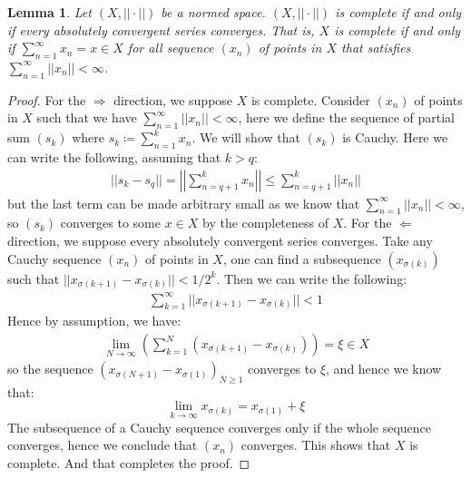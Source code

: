 \documentclass[11pt]{book}
\theoremstyle{break}
\theoremstyle{break}
\newtheorem{lem}{Lemma}[thm]
\begin{document}
\begin{lem}
Let $(X,||\cdot ||)$ be a normed space. $(X,||\cdot||)$ is complete if and only if every absolutely convergent series converges. That is, $X$ is complete if and only if $\sum_{n=1}^\infty x_n = x \in X$ for all sequence $(x_n)$ of points in $X$ that satisfies $\sum_{n=1}^\infty ||x_n|| < \infty$.
\end{lem}
\begin{proof}
For the $\Rightarrow$ direction, we suppose $X$ is complete. Consider $(x_n)$ of points in $X$ such that we have $\sum_{n=1}^\infty ||x_n|| < \infty$, here we define the sequence of partial sum $(s_k)$ where $s_k \coloneqq \sum_{n=1}^k x_n$. We will show that $(s_k)$ is Cauchy. Here we can write the following, assuming that $k > q$:
\begin{align}
||s_k - s_q|| = \left|\left| \sum_{n=q+1}^k x_n\right|\right|\leq \sum_{n=q+1}^k ||x_n||
\end{align}
but the last term can be made arbitrary small as we know that $\sum_{n=1}^\infty ||x_n|| < \infty$, so  $(s_k)$ converges to some $x \in X$ by the completeness of $X$. For the $\Leftarrow$ direction, we suppose every absolutely convergent series converges. Take any Cauchy sequence $(x_n)$ of points in $X$, one can find a subsequence $(x_{\sigma(k)})$ such that $||x_{\sigma(k+1)} - x_{\sigma(k)}|| < 1/2^k$. Then we can write the following:
\begin{align*}
\sum_{k=1}^\infty ||x_{\sigma(k+1)} - x_{\sigma(k)}|| < 1
\end{align*}
Hence by assumption, we have:
\begin{align*}
\lim_{N \to \infty}\left(\sum_{k=1}^N \left( x_{\sigma(k+1)} - x_{\sigma(k)}\right)  \right) = \xi \in X
\end{align*}
so the sequence $(x_{\sigma(N+1)} -x_{\sigma(1)} )_{N \geq 1}$ converges to $\xi$, and hence we know that: 
$$\lim_{k\to \infty}x_{\sigma(k)} = x_{\sigma(1)}+\xi$$ 
The subsequence of a Cauchy sequence converges only if the whole sequence converges, hence we conclude that $(x_n)$ converges. This shows that $X$ is complete. And that completes the proof. 
\end{proof}
\end{document}
